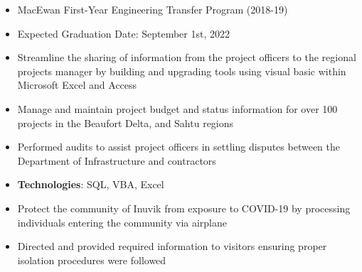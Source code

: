 \documentclass[10pt, letterpaper, ragged2e, withhyper]{altacv}
\begin{document}
\tagline{}

\makecvheader


\begin{paracol}{2}
        \begin{itemize}
            \item MacEwan First-Year Engineering Transfer Program (2018-19)
            \item Expected Graduation Date: September 1st, 2022
        \end{itemize}


            \begin{itemize}
                \item Streamline the sharing of information from the project officers to the regional 
                projects manager by building and upgrading tools using visual basic within Microsoft Excel and Access 
                \item Manage and maintain project budget and status information for over 100 projects in the Beaufort Delta, and Sahtu regions  
                \item Performed audits to assist project officers in settling disputes between the Department of Infrastructure and contractors 
                \item \textbf{Technologies}: SQL, VBA, Excel 
            \end{itemize}

            \begin{itemize}
                \item Protect the community of Inuvik from exposure to COVID-19 by processing individuals entering the community via airplane 
                \item Directed and provided required information to visitors ensuring proper isolation procedures were followed
            \end{itemize}


\end{paracol}
\end{document}
